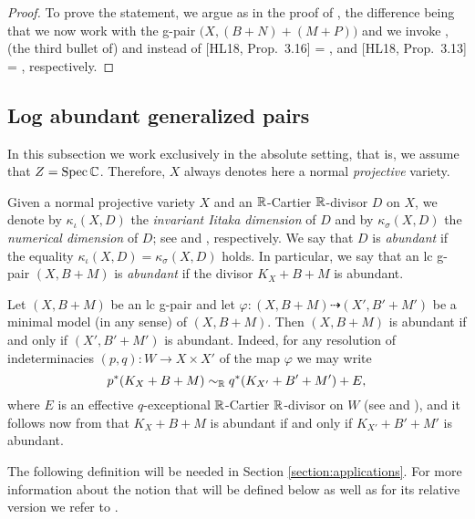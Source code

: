 	\begin{proof}
		To prove the statement, we argue as in the proof of \cite[Lemma 2.20]{LT22a}, the difference being that we now work with the g-pair $ \big( X, (B+N) + (M+P) \big) $ and we invoke \cite[Proposition 2.6]{HanLiu20}, (the third bullet of) \cite[Theorem 1.5]{Xie22} and \cite[Theorem 1.3(2)]{HaconLiu21} instead of [HL18, Prop.\ 3.16] = \cite[Proposition 3.20]{HanLi22}, \cite[Theorem 3.25(4)]{KM98} and [HL18, Prop.\ 3.13] = \cite[Proposition 3.17]{HanLi22}, respectively.
	\end{proof}
	
	
	\subsection{Log abundant generalized pairs}
	\label{subsection:log_abundant}
	
	In this subsection we work exclusively in the absolute setting, that is, we assume that $ Z = \operatorname{Spec} \mathbb{C} $. Therefore, $ X $ always denotes here a normal \emph{projective} variety.
	
	Given a normal projective variety $ X $ and an $ \mathbb{R} $-Cartier $ \mathbb{R} $-divisor $ D $ on $ X $, we denote by $ \kappa_\iota(X,D) $ the \emph{invariant Iitaka dimension} of $ D $ and by $ \kappa_\sigma(X,D) $ the \emph{numerical dimension} of $ D $; see \cite{Choi08} and \cite{Nak04}, respectively.
	We say that $ D $ is \emph{abundant} if the equality $ \kappa_\iota(X,D) = \kappa_\sigma(X,D) $ holds. In particular, we say that an lc g-pair $ (X,B+M) $ is \emph{abundant} if the divisor $ K_X+B+M $ is abundant.
	
	\begin{rem}\label{rem:abundant_MM}
		Let $(X,B+M)$ be an lc g-pair and let $ \varphi \colon (X,B+M) \dashrightarrow (X',B'+M')$ be a minimal model (in any sense) of $(X,B+M)$. Then $(X,B+M)$ is abundant if and only if $(X',B'+M')$ is abundant. Indeed, for any resolution of indeterminacies $ (p,q) \colon W \to X \times X' $ of the map $\varphi$ we may write
		\[ p^* (K_X+B+M) \sim_{\mathbb{R}} q^* (K_{X'}+B'+M') + E , \]
		where $E$ is an effective $q$-exceptional $\mathbb{R}$-Cartier $\mathbb{R}$-divisor on $W$ (see \cite[Lemma 2.8(i)]{LMT} and \cite[Remark 2.6]{LT22b}), and it follows now from \cite[Remark 2.15(2)]{Hash20d} that $K_X+B+M$ is abundant if and only if $K_{X'}+B'+M'$ is abundant.
	\end{rem}
	
	The following definition will be needed in Section \ref{section:applications}. For more information about the notion that will be defined below as well as for its relative version we refer to \cite[Subsection 2.3]{Hash20d}.
	
